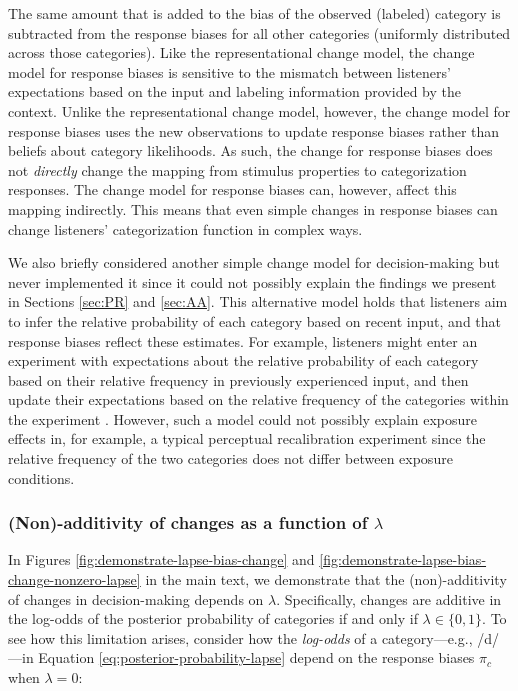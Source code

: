 \documentclass[
  11pt,
  man,floatsintext]{apa6}
\begin{document}
The same amount that is added to the bias of the observed (labeled) category is subtracted from the response biases for all other categories (uniformly distributed across those categories).
Like the representational change model, the change model for response biases is sensitive to the mismatch between listeners' expectations based on the input and labeling information provided by the context. Unlike the representational change model, however, the change model for response biases uses the new observations to update response biases rather than beliefs about category likelihoods. As such, the change for response biases does not \emph{directly} change the mapping from stimulus properties to categorization responses. The change model for response biases can, however, affect this mapping indirectly. This means that even simple changes in response biases can change listeners' categorization function in complex ways.

We also briefly considered another simple change model for decision-making but never implemented it since it could not possibly explain the findings we present in Sections \ref{sec:PR} and \ref{sec:AA}. This alternative model holds that listeners aim to infer the relative probability of each category based on recent input, and that response biases reflect these estimates. For example, listeners might enter an experiment with expectations about the relative probability of each category based on their relative frequency in previously experienced input, and then update their expectations based on the relative frequency of the categories within the experiment \autocites[similar to belief-updating models of syntactic adaptation,][]{fine-jaeger2013,jaeger2019,prasad2021}. However, such a model could not possibly explain exposure effects in, for example, a typical perceptual recalibration experiment since the relative frequency of the two categories does not differ between exposure conditions.

\subsubsection{\texorpdfstring{(Non)-additivity of changes as a function of \(\lambda\)}{(Non)-additivity of changes as a function of \textbackslash lambda}}\label{sec:consequences-of-lambda}

In Figures \ref{fig:demonstrate-lapse-bias-change} and \ref{fig:demonstrate-lapse-bias-change-nonzero-lapse} in the main text, we demonstrate that the (non)-additivity of changes in decision-making depends on \(\lambda\). Specifically, changes are additive in the log-odds of the posterior probability of categories if and only if \(\lambda \in \{0, 1\}\). To see how this limitation arises, consider how the \emph{log-odds} of a category---e.g., /d/---in Equation \eqref{eq:posterior-probability-lapse} depend on the response biases \(\pi_c\) when \(\lambda=0\):
\end{document}
